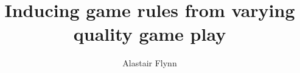 \documentclass[a4paper,10pt]{report}
\begin{document}
\title{\Large{\textbf{Inducing game rules from varying quality game play}}}
\author{Alastair Flynn}
\maketitle












\end{document}
